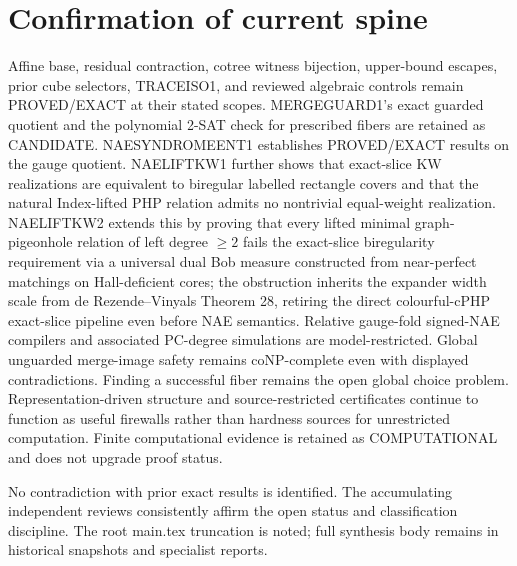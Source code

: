 \documentclass[11pt]{article}
\begin{document}
\section{Confirmation of current spine}
Affine base, residual contraction, cotree witness bijection, upper-bound escapes, prior cube selectors, TRACEISO1, and reviewed algebraic controls remain PROVED/EXACT at their stated scopes. MERGEGUARD1's exact guarded quotient and the polynomial 2-SAT check for prescribed fibers are retained as CANDIDATE. NAESYNDROMEENT1 establishes PROVED/EXACT results on the gauge quotient. NAELIFTKW1 further shows that exact-slice KW realizations are equivalent to biregular labelled rectangle covers and that the natural Index-lifted PHP relation admits no nontrivial equal-weight realization. NAELIFTKW2 extends this by proving that every lifted minimal graph-pigeonhole relation of left degree $\ge 2$ fails the exact-slice biregularity requirement via a universal dual Bob measure constructed from near-perfect matchings on Hall-deficient cores; the obstruction inherits the expander width scale from de Rezende--Vinyals Theorem 28, retiring the direct colourful-cPHP exact-slice pipeline even before NAE semantics. Relative gauge-fold signed-NAE compilers and associated PC-degree simulations are model-restricted. Global unguarded merge-image safety remains coNP-complete even with displayed contradictions. Finding a successful fiber remains the open global choice problem. Representation-driven structure and source-restricted certificates continue to function as useful firewalls rather than hardness sources for unrestricted computation. Finite computational evidence is retained as COMPUTATIONAL and does not upgrade proof status.

No contradiction with prior exact results is identified. The accumulating independent reviews consistently affirm the open status and classification discipline. The root main.tex truncation is noted; full synthesis body remains in historical snapshots and specialist reports.
\end{document}
